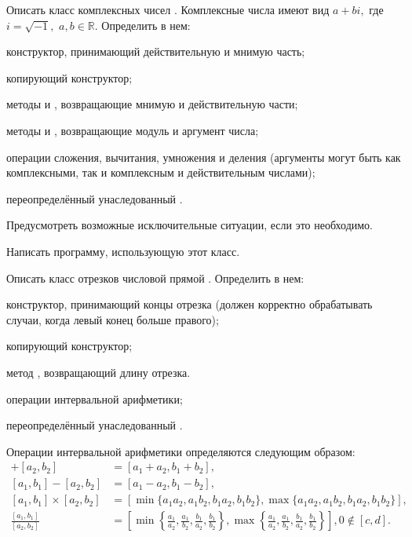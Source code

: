 \task Описать класс комплексных чисел . Комплексные числа
имеют вид $a+bi,$ где $i=\sqrt{-1},$ $a,b \in \mathbb{R}$. Определить
в нем:
\begin{itemize*}
\item конструктор, принимающий действительную и мнимую часть;
\item копирующий конструктор;
\item методы  и , возвращающие мнимую и действительную
  части;
\item методы  и , возвращающие модуль и аргумент
  числа;
\item операции сложения, вычитания, умножения и деления (аргументы
  могут быть как комплексными, так и комплексным и действительным
  числами);
\item переопределённый унаследованный .
\end{itemize*}

Предусмотреть возможные исключительные ситуации, если это необходимо.

Написать программу, использующую этот класс.

\task Описать класс отрезков числовой прямой
. Определить в нем:
\begin{itemize*}
\item конструктор, принимающий концы отрезка (должен корректно
  обрабатывать случаи, когда левый конец больше правого);
\item копирующий конструктор;
\item метод , возвращающий длину отрезка.
\item операции интервальной арифметики;
\item переопределённый унаследованный .
\end{itemize*}

Операции интервальной арифметики
определяются следующим образом:
\begin{align*}
  [a_1, b_1] + [a_2, b_2] &= [a_1 + a_2, b_1 + b_2],\\
  [a_1, b_1] - [a_2, b_2] &= [a_1 - a_2, b_1 - b_2],\\
  [a_1, b_1] \times [a_2, b_2] &=
  [\min \{a_1a_2, a_1b_2, b_1a_2, b_1b_2\}, \max \{a_1a_2, a_1b_2, b_1a_2, b_1b_2\}],\\
  \frac{[a_1, b_1]}{[a_2, b_2]} &=
  \left[
    \min \left\{\frac{a_1}{a_2}, \frac{a_1}{b_2}, \frac{b_1}{a_2}, \frac{b_1}{b_2}\right\},
    \max \left\{\frac{a_1}{a_2}, \frac{a_1}{b_2}, \frac{b_1}{a_2}, \frac{b_1}{b_2}\right\}
    \right], 0\not\in[c, d].
\end{align*}

